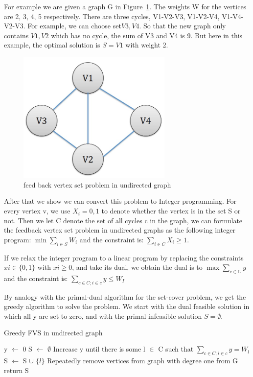 \documentclass[usletter]{article}
\begin{document}
For example we are given a graph G in Figure~\ref{fig:FVS}. The weights W for the vertices are 2, 3, 4, 5 respectively. There are three cycles, V1-V2-V3, V1-V2-V4, V1-V4-V2-V3. For example, we can choose set$ {V3, V4}$. So that the new graph only contains ${V1, V2}$ which has no cycle, the sum of V3 and V4 is 9. But here in this example, the optimal solution is $S={V1}$ with weight 2.

\begin{figure}[bht]
\begin{center}
     \includegraphics[width=3.0in]{figures/FVS}
\caption{\label{fig:FVS}feed back vertex set problem in undirected graph}
\end{center}
\end{figure}

After that we show we can convert this problem to Integer programming. For every vertex v, we use $ X_i = {0, 1}$ to denote whether the vertex is in the set S or not. Then we let C denote the set of all cycles c in the graph, we can formulate the feedback vertex set problem in undirected graphs as the following integer program: $\min{\sum_{i \in S} {W_i}}$ and the constraint is: $\sum_{i \in C} X_i \ge 1$.

If we relax the integer program to a linear program by replacing the constraints $xi \in \{0, 1\}$ with $xi \ge 0$, and take its dual, we obtain the dual is to $\max{\sum_{c \in C} y}$ and the constraint is: $\sum_{c \in C; i \in c} y \le W_I$

By analogy with the primal-dual algorithm for the set-cover problem, we get the greedy algorithm to solve the problem. We start with the dual feasible solution in which all y are set to zero, and with the primal infeasible solution $S = \emptyset$.

\begin{algorithm}
\caption{Greedy FVS in undirected graph}
\begin{algorithmic}[1]
\State y $\leftarrow$ 0
\State S $\leftarrow$  $\emptyset$
	\State Increase y until there is some l $\in$ C such that  $\sum_{c \in C; i \in c} y = W_l$
	\State S $\leftarrow$ S $\cup$ $\{l\}$
	\State Repeatedly remove vertices from graph with degree one from G
\State return S
\EndWhile
\end{algorithmic}
\end{algorithm}
\end{document}
